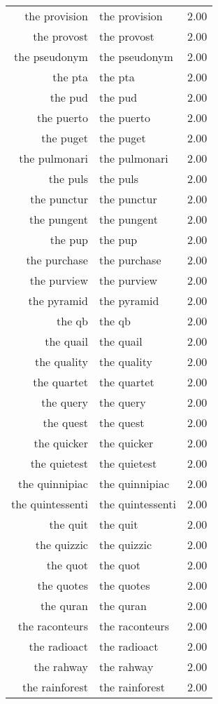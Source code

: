 \begin{table}[ht]
\begin{tabular}{rlr}
  the provision & the provision & 2.00 \\ 
  the provost & the provost & 2.00 \\ 
  the pseudonym & the pseudonym & 2.00 \\ 
  the pta & the pta & 2.00 \\ 
  the pud & the pud & 2.00 \\ 
  the puerto & the puerto & 2.00 \\ 
  the puget & the puget & 2.00 \\ 
  the pulmonari & the pulmonari & 2.00 \\ 
  the puls & the puls & 2.00 \\ 
  the punctur & the punctur & 2.00 \\ 
  the pungent & the pungent & 2.00 \\ 
  the pup & the pup & 2.00 \\ 
  the purchase & the purchase & 2.00 \\ 
  the purview & the purview & 2.00 \\ 
  the pyramid & the pyramid & 2.00 \\ 
  the qb & the qb & 2.00 \\ 
  the quail & the quail & 2.00 \\ 
  the quality & the quality & 2.00 \\ 
  the quartet & the quartet & 2.00 \\ 
  the query & the query & 2.00 \\ 
  the quest & the quest & 2.00 \\ 
  the quicker & the quicker & 2.00 \\ 
  the quietest & the quietest & 2.00 \\ 
  the quinnipiac & the quinnipiac & 2.00 \\ 
  the quintessenti & the quintessenti & 2.00 \\ 
  the quit & the quit & 2.00 \\ 
  the quizzic & the quizzic & 2.00 \\ 
  the quot & the quot & 2.00 \\ 
  the quotes & the quotes & 2.00 \\ 
  the quran & the quran & 2.00 \\ 
  the raconteurs & the raconteurs & 2.00 \\ 
  the radioact & the radioact & 2.00 \\ 
  the rahway & the rahway & 2.00 \\ 
  the rainforest & the rainforest & 2.00 \\ 

\end{tabular}
\end{table}
